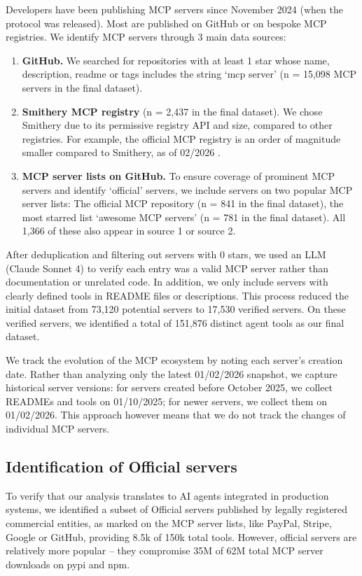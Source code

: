 \documentclass[manuscript,screen,nonacm,oneside]{acmart}
\begin{document}
Developers have been publishing MCP servers since November 2024 (when the protocol was released). Most are published on GitHub or on bespoke MCP registries. We identify MCP servers through 3 main data sources:

\begin{enumerate}
\def\labelenumi{\arabic{enumi}.}
\item
 \textbf{GitHub.} We searched for repositories with at least 1 star whose name, description, readme or tags includes the string `mcp server' (n = 15,098 MCP servers in the final dataset).
\item
 \textbf{Smithery MCP registry} (n = 2,437 in the final dataset). We chose Smithery due to its permissive registry API and size, compared to other registries. For example, the official MCP registry is an order of magnitude smaller compared to Smithery, as of 02/2026 \citep{modelcontextprotocolOfficialRegistry}.
\item
 \textbf{MCP server lists on GitHub.} To ensure coverage of prominent MCP servers and identify `official' servers, we include servers on two popular MCP server lists: The official MCP repository \citep{githubGitHubModelcontextprotocolservers} (n = 841 in the final dataset), the most starred list `awesome MCP servers' \citep{archiveGitHubPunkpeyeawesomemcpservers} (n = 781 in the final dataset). All 1,366 of these also appear in source 1 or source 2.
\end{enumerate}

After deduplication and filtering out servers with 0 stars, we used an LLM (Claude Sonnet 4) to verify each entry was a valid MCP server rather than documentation or unrelated code. In addition, we only include servers with clearly defined tools in README files or descriptions. This process reduced the initial dataset from 73,120 potential servers to 17,530 verified servers. On these verified servers, we identified a total of 151,876 distinct agent tools as our final dataset.

We track the evolution of the MCP ecosystem by noting each server's creation date. Rather than analyzing only the latest 01/02/2026 snapshot, we capture historical server versions: for servers created before October 2025, we collect READMEs and tools on 01/10/2025; for newer servers, we collect them on 01/02/2026. This approach however means that we do not track the changes of individual MCP servers.

\subsection{Identification of Official servers}
\label{sec:official-servers}
To verify that our analysis translates to AI agents integrated in production systems, we identified a subset of \textquotesingle Official\textquotesingle{} servers published by legally registered commercial entities, as marked on the MCP server lists, like PayPal, Stripe, Google or GitHub, providing 8.5k of 150k total tools. However, official servers are relatively more popular -- they compromise 35M of 62M total MCP server downloads on pypi and npm.
\end{document}
